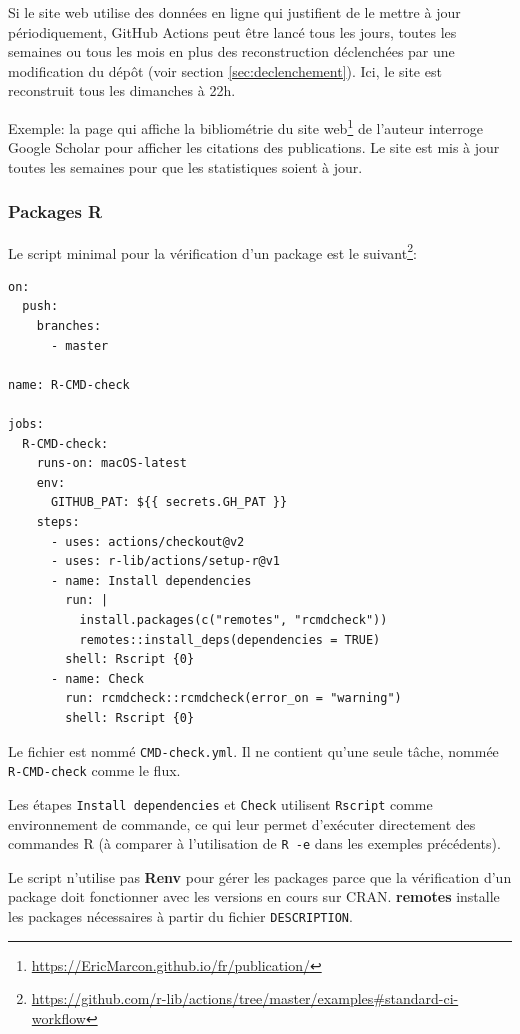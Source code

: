 \documentclass[
  11pt,
  french,
  a4paper,
  extrafontsizes,onecolumn,openright
  ]{memoir}
\begin{document}
Si le site web utilise des données en ligne qui justifient de le mettre à jour périodiquement, GitHub Actions peut être lancé tous les jours, toutes les semaines ou tous les mois en plus des reconstruction déclenchées par une modification du dépôt (voir section \ref{sec:declenchement}).
Ici, le site est reconstruit tous les dimanches à 22h.

Exemple: la page qui affiche la bibliométrie du site web\footnote{\url{https://EricMarcon.github.io/fr/publication/}} de l'auteur interroge Google Scholar pour afficher les citations des publications.
Le site est mis à jour toutes les semaines pour que les statistiques soient à jour.

\hypertarget{sec:package-ci6}{%
\subsubsection{Packages R}\label{sec:package-ci6}}

Le script minimal pour la vérification d'un package est le suivant\footnote{\url{https://github.com/r-lib/actions/tree/master/examples\#standard-ci-workflow}}:

\begin{verbatim}
on:
  push:
    branches:
      - master

name: R-CMD-check

jobs:
  R-CMD-check:
    runs-on: macOS-latest
    env:
      GITHUB_PAT: ${{ secrets.GH_PAT }}
    steps:
      - uses: actions/checkout@v2
      - uses: r-lib/actions/setup-r@v1
      - name: Install dependencies
        run: |
          install.packages(c("remotes", "rcmdcheck"))
          remotes::install_deps(dependencies = TRUE)
        shell: Rscript {0}
      - name: Check
        run: rcmdcheck::rcmdcheck(error_on = "warning")
        shell: Rscript {0}
\end{verbatim}

Le fichier est nommé \texttt{CMD-check.yml}.
Il ne contient qu'une seule tâche, nommée \texttt{R-CMD-check} comme le flux.

Les étapes \texttt{Install\ dependencies} et \texttt{Check} utilisent \texttt{Rscript} comme environnement de commande, ce qui leur permet d'exécuter directement des commandes R (à comparer à l'utilisation de \texttt{R\ -e} dans les exemples précédents).

Le script n'utilise pas \textbf{Renv} pour gérer les packages parce que la vérification d'un package doit fonctionner avec les versions en cours sur CRAN.
\textbf{remotes} installe les packages nécessaires à partir du fichier \texttt{DESCRIPTION}.
\end{document}
